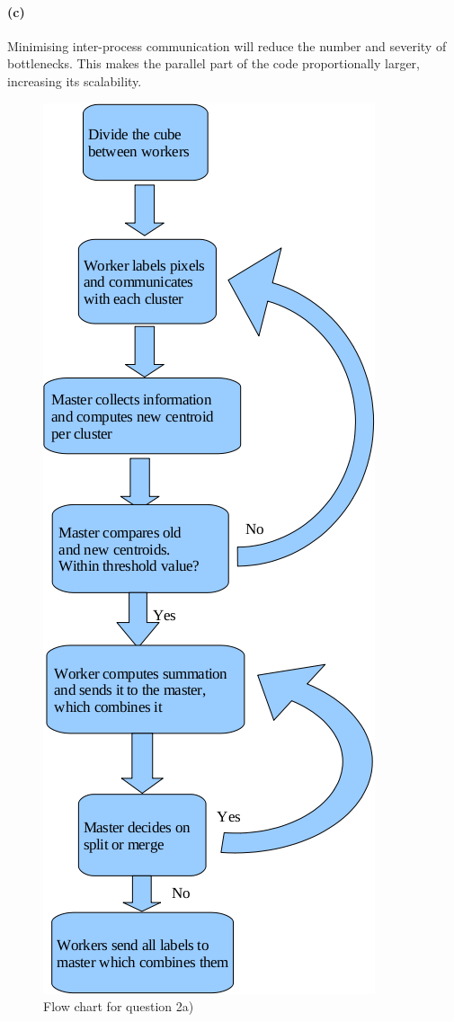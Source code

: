 \documentclass{article}
\begin{document}
\paragraph{(c)}
Minimising inter-process communication will reduce the number and severity of
bottlenecks. This makes the parallel part of the code proportionally larger,
increasing its scalability.

\begin{figure}[tp]
\centering \includegraphics[scale=0.7]{question2_a.png}
\caption{Flow chart for question 2a)}\label{fig:2a}
\end{figure}
\end{document}
